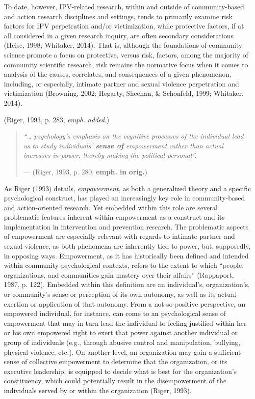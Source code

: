 \documentclass[11pt,]{tufte-book}
\begin{document}
To date, however, IPV-related research, within and outside of
community-based and action research disciplines and settings, tends to
primarily examine risk factors for IPV perpetration and/or
victimization, while protective factors, if at all considered in a given
research inquiry, are often secondary considerations (Heise, 1998;
Whitaker, 2014). That is, although the foundations of community science
promote a focus on protective, versus risk, factors, among the majority
of community scientific research, risk remains the normative focus when
it comes to analysis of the causes, correlates, and consequences of a
given phenomenon, including, or especially, intimate partner and sexual
violence perpetration and victimization (Browning, 2002; Hegarty,
Sheehan, \& Schonfeld, 1999; Whitaker, 2014).

(Riger, 1993, p. 283, \emph{emph. added.})

\singlespacing

\begin{quote}
\emph{``\ldots{} psychology's emphasis on the cognitive processes of the
individual lead us to study individuals' \textbf{sense of} empowerment
rather than actual increases in power, thereby making the political
personal''.}

\hfill --- (Riger, 1993, p. 280, \textbf{emph. in orig.})
\end{quote}

\doublespacing

As Riger (1993) details, \emph{empowerment}, as both a generalized
theory and a specific psychological construct, has played an
increasingly key role in community-based and action-oriented research.
Yet embedded within this role are several problematic features inherent
within empowerment as a construct and its implementation in intervention
and prevention research. The problematic aspects of empowerment are
especially relevant with regards to intimate partner and sexual
violence, as both phenomena are inherently tied to power, but,
supposedly, in opposing ways. Empowerment, as it has historically been
defined and intended within community-psychological contexts, refers to
the extent to which ``people, organizations, and communities gain
mastery over their affairs'' (Rappaport, 1987, p. 122). Embedded within
this definition are an individual's, organization's, or community's
sense or perception of its own autonomy, as well as its actual exertion
or application of that autonomy. From a not-so-positive perspective, an
empowered individual, for instance, can come to an psychological sense
of empowerment that may in turn lead the individual to feeling justified
within her or his own empowered right to exert that power against
another individual or group of individuals (e.g., through abusive
control and manipulation, bullying, physical violence, etc.). On another
level, an organization may gain a sufficient sense of collective
empowerment to determine that the organization, or its executive
leadership, is equipped to decide what is best for the organization's
constituency, which could potentially result in the disempowerment of
the individuals served by or within the organization (Riger, 1993).
\end{document}
